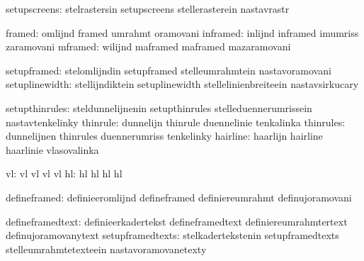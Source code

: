                  setupscreens:  stelrastersin                setupscreens
                                stellerasterein              nastavrastr

                       framed:  omlijnd                      framed
                                umrahmt                      oramovani
                     inframed:  inlijnd                      inframed
                                imumriss                     zaramovani
                      mframed:  wilijnd                      maframed
                                maframed                     mazaramovani

                  setupframed:  stelomlijndin                setupframed
                                stelleumrahmtein             nastavoramovani
               setuplinewidth:  stellijndiktein              setuplinewidth
                                stellelinienbreiteein        nastavsirkucary

               setupthinrules:  steldunnelijnenin            setupthinrules
                                stelleduennerumrissein       nastavtenkelinky
                     thinrule:  dunnelijn                    thinrule
                                duennelinie                  tenkalinka
                    thinrules:  dunnelijnen                  thinrules
                                duennerumriss                tenkelinky
                     hairline:  haarlijn                     hairline
                                haarlinie                    vlasovalinka

                           vl:  vl                           vl
                                vl                           vl
                           hl:  hl                           hl
                                hl                           hl

                 defineframed:  definieeromlijnd             defineframed
                                definiereumrahmt             definujoramovani

             defineframedtext:  definieerkadertekst          defineframedtext
                                definiereumrahmtertext       definujoramovanytext
             setupframedtexts:  stelkadertekstenin           setupframedtexts
                                stelleumrahmtetexteein       nastavoramovanetexty

